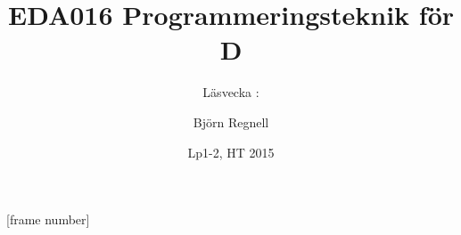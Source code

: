 [frame number]
\title[Föreläsningsanteckningar EDA016, 2015]{EDA016 Programmeringsteknik för D}
\subtitle{Läsvecka \vecka: \veckotema}
\author{Björn Regnell}
\date{Lp1-2, HT 2015}







